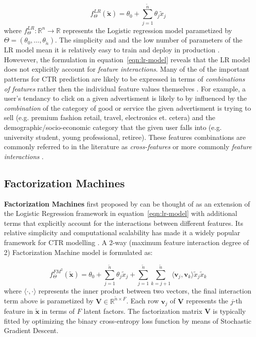 \documentclass{mldsmsc}
\begin{document}
\begin{equation}
\label{eqn:lr-model}
f_{\Theta}^{LR}(\tilde{\mathbf{x}}) = \theta_0 + \sum_{j=1}^{\tilde{n}}\theta_j \tilde{x}_j
\end{equation}
where $f_{\Theta}^{LR}: \mathbb{R}^n \rightarrow \mathbb{R}$ represents the Logistic regression
model parametized by $\Theta = (\theta_0, \ldots, \theta_{\tilde{n}})$. The simplicity and 
and the low number of parameters of the LR model mean it is relatively easy to
train and deploy in production \citep{RefWorks:zhang2021deep}.
Howevever, the formulation in equation~\ref{eqn:lr-model} reveals that the LR model does not explicitly 
account for \emph{feature interactions}. Many of the of the important patterns
for CTR prediction are likely to be expressed in terms of \emph{combinations of features}
rather then the individual feature values themselves \citep{RefWorks:zhang2021deep}. For example, a user's tendancy to
click on a given advertisment is likely to by influenced by the \emph{combination} of the category
of good or service the given advertisment is trying to sell (e.g. premium fashion retail, travel, electronics et. cetera)
and the demographic/socio-economic category that the given user falls into (e.g. university student, young professional, retiree).
These features combinations are commonly referred to in
the literature as \emph{cross-features} \citep{RefWorks:zhang2023memonet:} or more commonly
\emph{feature interactions} \citep{RefWorks:cheng2016wide,RefWorks:xiao2017attentional,RefWorks:song2019autoint}.

\subsection{Factorization Machines}

\textbf{Factorization Machines} first proposed by \cite{RefWorks:rendle2010factorization} can 
be thought of as an extension of the Logistic Regression framework in equation~\ref{eqn:lr-model}
with additional terms that explicitly account for the interactions between different features.
Its relative simplicity and computational scalability has made it a widely popular framework
for CTR modelling \citep{RefWorks:gu2021ad}. 
A 2-way (maximum feature interaction degree of 2) Factorization Machine model is formulated as:

\begin{equation}
\label{eqn:fm-2way}
f_{\Theta}^{FM^2}(\tilde{\mathbf{x}}) = \theta_0 + \sum_{j=1}^{\tilde{n}} \theta_{j} \tilde{x}_j
+ \sum_{j=1}^{\tilde{n}} \sum_{k=j+1}^{\tilde{n}} \langle \mathbf{v}_j , \mathbf{v}_k \rangle \tilde{x}_j \tilde{x}_k
\end{equation}
where $\langle \cdot , \cdot \rangle$ represents the inner product between two vectors, the final
interaction term above is parametized by $\mathbf{V} \in \mathbb{R}^{\tilde{n} \times F}$. Each
row $\mathbf{v}_j$ of $\mathbf{V}$ represents the $j$-th feature in $\tilde{\mathbf{x}}$ in terms
of $F$ latent factors. The factorization matrix $\mathbf{V}$ is typically fitted by optimizing
the binary cross-entropy loss function by means of Stochastic Gradient Descent.
\end{document}
